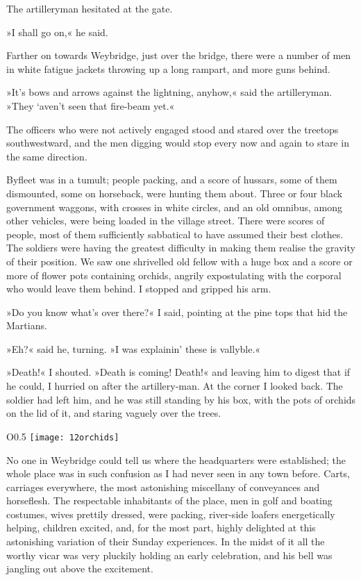 The artilleryman hesitated at the gate.

»I shall go on,« he said.

Farther on towards Weybridge, just over the bridge, there were a number of men in white fatigue jackets throwing up a long rampart, and more guns behind.

»It's bows and arrows against the lightning, anyhow,« said the artilleryman. »They `aven't seen that fire-beam yet.«

The officers who were not actively engaged stood and stared over the treetops southwestward, and the men digging would stop every now and again to stare in the same direction.


Byfleet was in a tumult; people packing, and a score of hussars, some of them dismounted, some on horseback, were hunting them about. Three or four black government waggons, with crosses in white circles, and an old omnibus, among other vehicles, were being loaded in the village street. There were scores of people, most of them sufficiently sabbatical to have assumed their best clothes. The soldiers were having the greatest difficulty in making them realise the gravity of their position. We saw one shrivelled old fellow with a huge box and a score or more of flower pots containing orchids, angrily expostulating with the corporal who would leave them behind. I stopped and gripped his arm.

»Do you know what's over there?« I said, pointing at the pine tops that hid the Martians.

»Eh?« said he, turning. »I was explainin' these is vallyble.«

»Death!« I shouted. »Death is coming! Death!« and leaving him to digest that if he could, I hurried on after the artillery-man. At the corner I looked back. The soldier had left him, and he was still standing by his box, with the pots of orchids on the lid of it, and staring vaguely over the trees.

\begin{wrapfigure}{O}{0.5\textwidth}
\centering
\texttt{[image: 12orchids]}
\end{wrapfigure}

No one in Weybridge could tell us where the headquarters were established; the whole place was in such confusion as I had never seen in any town before. Carts, carriages everywhere, the most astonishing miscellany of conveyances and horseflesh. The respectable inhabitants of the place, men in golf and boating costumes, wives prettily dressed, were packing, river-side loafers energetically helping, children excited, and, for the most part, highly delighted at this astonishing variation of their Sunday experiences. In the midst of it all the worthy vicar was very pluckily holding an early celebration, and his bell was jangling out above the excitement.

